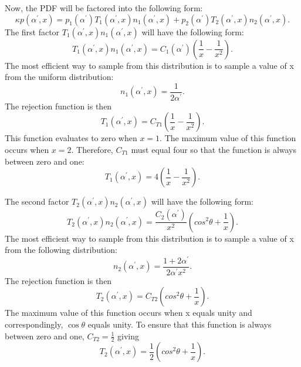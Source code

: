 Now, the PDF will be factored into the following form:
\begin{equation*}
  \kappa p(\alpha^{'},x) = p_1(\alpha^{'})T_1(\alpha^{'},x)n_1(\alpha^{'},x) + 
  p_2(\alpha^{'})T_2(\alpha^{'},x)n_2(\alpha^{'},x).
\end{equation*}
The first factor $T_1(\alpha^{'},x)n_1(\alpha^{'},x)$ will have the following 
form:
\begin{equation*}
  T_1(\alpha^{'},x)n_1(\alpha^{'},x) = C_1(\alpha^{'})\left(\frac{1}{x} - 
  \frac{1}{x^2}\right).
\end{equation*}
The most efficient way to sample from this distribution is to sample a value
of x from the uniform distribution:
\begin{equation}
  n_1(\alpha^{'},x) = \frac{1}{2\alpha^{'}}.
\end{equation}
The rejection function is then
\begin{equation*}
  T_1(\alpha^{'},x) = C_{T1}\left(\frac{1}{x} - \frac{1}{x^2}\right).
\end{equation*}
This function evaluates to zero when $x = 1$. The maximum value of this function
occurs when $x = 2$. Therefore, $C_{T1}$ must equal four so that the function
is always between zero and one:
\begin{equation}
  T_1(\alpha^{'},x) = 4\left(\frac{1}{x} - \frac{1}{x^2}\right).
\end{equation}

The second factor $T_2(\alpha^{'},x)n_2(\alpha^{'},x)$ will have the following 
form:
\begin{equation*}
  T_2(\alpha^{'},x)n_2(\alpha^{'},x) = \frac{C_2(\alpha^{'})}{x^2}
  \left(cos^2\theta + \frac{1}{x}\right).
\end{equation*}
The most efficient way to sample from this distribution is to sample a value
of x from the following distribution:
\begin{equation}
  n_2(\alpha^{'},x) = \frac{1+2\alpha^{'}}{2\alpha^{'} x^2}.
\end{equation}
The rejection function is then
\begin{equation*}
  T_2(\alpha^{'},x) = C_{T2}\left(cos^2\theta + \frac{1}{x} \right).
\end{equation*}
The maximum value of this function occurs when x equals unity and 
correspondingly, $\cos{\theta}$ equals unity. To ensure that this function is
always between zero and one, $C_{T2} = \frac{1}{2}$ giving
\begin{equation}
  T_2(\alpha^{'},x) = \frac{1}{2}\left(cos^2\theta + \frac{1}{x} \right).
\end{equation}


